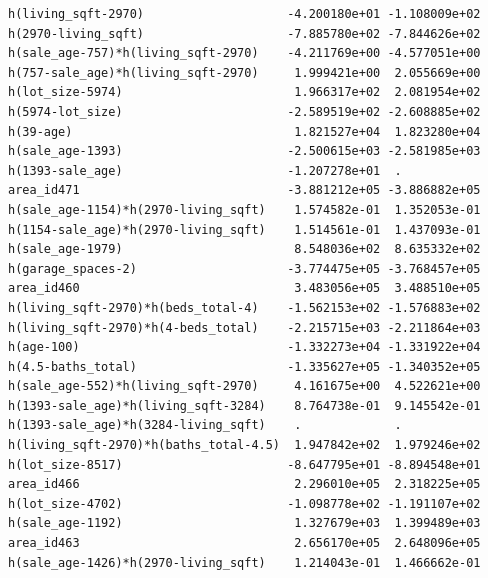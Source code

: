 \documentclass[
]{article}
\begin{document}
\begin{verbatim}
h(living_sqft-2970)                    -4.200180e+01 -1.108009e+02
h(2970-living_sqft)                    -7.885780e+02 -7.844626e+02
h(sale_age-757)*h(living_sqft-2970)    -4.211769e+00 -4.577051e+00
h(757-sale_age)*h(living_sqft-2970)     1.999421e+00  2.055669e+00
h(lot_size-5974)                        1.966317e+02  2.081954e+02
h(5974-lot_size)                       -2.589519e+02 -2.608885e+02
h(39-age)                               1.821527e+04  1.823280e+04
h(sale_age-1393)                       -2.500615e+03 -2.581985e+03
h(1393-sale_age)                       -1.207278e+01  .           
area_id471                             -3.881212e+05 -3.886882e+05
h(sale_age-1154)*h(2970-living_sqft)    1.574582e-01  1.352053e-01
h(1154-sale_age)*h(2970-living_sqft)    1.514561e-01  1.437093e-01
h(sale_age-1979)                        8.548036e+02  8.635332e+02
h(garage_spaces-2)                     -3.774475e+05 -3.768457e+05
area_id460                              3.483056e+05  3.488510e+05
h(living_sqft-2970)*h(beds_total-4)    -1.562153e+02 -1.576883e+02
h(living_sqft-2970)*h(4-beds_total)    -2.215715e+03 -2.211864e+03
h(age-100)                             -1.332273e+04 -1.331922e+04
h(4.5-baths_total)                     -1.335627e+05 -1.340352e+05
h(sale_age-552)*h(living_sqft-2970)     4.161675e+00  4.522621e+00
h(1393-sale_age)*h(living_sqft-3284)    8.764738e-01  9.145542e-01
h(1393-sale_age)*h(3284-living_sqft)    .             .           
h(living_sqft-2970)*h(baths_total-4.5)  1.947842e+02  1.979246e+02
h(lot_size-8517)                       -8.647795e+01 -8.894548e+01
area_id466                              2.296010e+05  2.318225e+05
h(lot_size-4702)                       -1.098778e+02 -1.191107e+02
h(sale_age-1192)                        1.327679e+03  1.399489e+03
area_id463                              2.656170e+05  2.648096e+05
h(sale_age-1426)*h(2970-living_sqft)    1.214043e-01  1.466662e-01
                                                                  

\end{verbatim}
\end{document}
